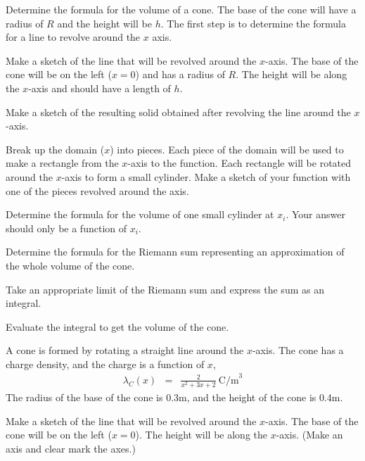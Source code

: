 \begin{problem}
\item Determine the formula for the volume of a cone.
    The base of the cone will have a radius of $R$ and the height will be $h$.
    The first step is to determine the formula for a line to revolve around the $x$ axis.
  \begin{subproblem}
  \item Make a sketch of the line that will be revolved around the
    $x$-axis.  The base of the cone will be on the left ($x=0$) and
    has a radius of $R$.  The height will be along the $x$-axis and
    should have a length of $h$.
    \vfill

    \item Make a sketch of the resulting solid obtained after
      revolving the line around the $x$-axis.
      \vfill

    \item Break up the domain ($x$) into pieces. Each piece of the
      domain will be used to make a rectangle from the $x$-axis to the
      function. Each rectangle will be rotated around the $x$-axis to
      form a small cylinder.  Make a sketch of your function with one
      of the pieces revolved around the axis.  \vfill

    \clearpage

    \item Determine the formula for the volume of one small cylinder at $x_i$. Your answer should only be a function of $x_i$.
      \vfill

    \item Determine the formula for the Riemann sum representing an
      approximation of the whole volume of the cone.
      \vfill

    \item Take an appropriate limit of the Riemann sum and express the sum as an integral.
      \vfill

    \item Evaluate the integral to get the volume of the cone.
      \vfill

  \end{subproblem}

  \clearpage

  \item A cone is formed by rotating a straight line around the $x$-axis.
     The cone has a charge density, and the charge is a function of $x$,
     \begin{eqnarray*}
       \lambda_C(x) & = & \frac{2}{x^2+3x+2} ~ \mathrm{C/m}^3
     \end{eqnarray*}
     The radius of the base of the cone is 0.3m, and the height of the cone is 0.4m.
     \begin{subproblem}
       \item
         Make a sketch of the line that will be revolved around the $x$-axis.
         The base of the cone will be on the left ($x=0$).
         The height will be along the $x$-axis.
         (Make an axis and clear mark the axes.)
         \vfill


\end{subproblem}
\end{problem}
